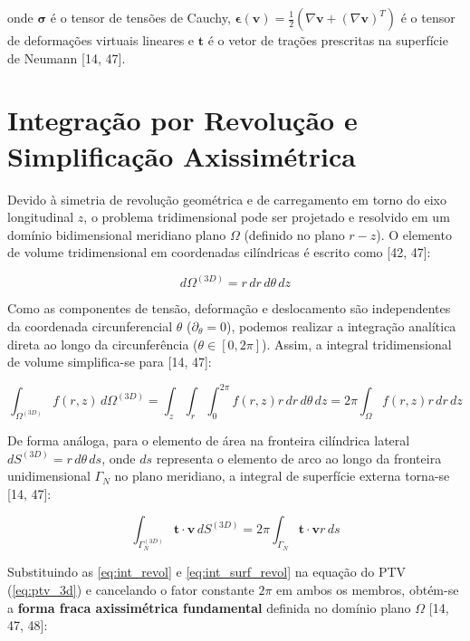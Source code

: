 onde $\mathbf{\sigma}$ é o tensor de tensões de Cauchy, $\mathbf{\epsilon}(\mathbf{v}) = \frac{1}{2} (\nabla \mathbf{v} + (\nabla \mathbf{v})^T)$ é o tensor de deformações virtuais lineares e $\mathbf{t}$ é o vetor de trações prescritas na superfície de Neumann [14, 47].

\section{Integração por Revolução e Simplificação Axissimétrica}

Devido à simetria de revolução geométrica e de carregamento em torno do eixo longitudinal $z$, o problema tridimensional pode ser projetado e resolvido em um domínio bidimensional meridiano plano $\Omega$ (definido no plano $r-z$). O elemento de volume tridimensional em coordenadas cilíndricas é escrito como [42, 47]:

\begin{equation}
  d \Omega^{(3D)} = r \, d r \, d \theta \, d z
  \label{eq:vol_element}
\end{equation}

Como as componentes de tensão, deformação e deslocamento são independentes da coordenada circunferencial $\theta$ ($\partial_{\theta} = 0$), podemos realizar a integração analítica direta ao longo da circunferência ($\theta \in [0, 2\pi]$). Assim, a integral tridimensional de volume simplifica-se para [14, 47]:

\begin{equation}
  \int_{\Omega^{(3D)}} f(r, z) \, d \Omega^{(3D)} = \int_{z} \int_{r} \int_0^{2\pi} f(r, z) r \, d r \, d \theta \, d z = 2 \pi \int_{\Omega} f(r, z) r \, d r \, d z
  \label{eq:int_revol}
\end{equation}

De forma análoga, para o elemento de área na fronteira cilíndrica lateral $d S^{(3D)} = r \, d \theta \, d s$, onde $d s$ representa o elemento de arco ao longo da fronteira unidimensional $\Gamma_N$ no plano meridiano, a integral de superfície externa torna-se [14, 47]:

\begin{equation}
  \int_{\Gamma_N^{(3D)}} \mathbf{t} \cdot \mathbf{v} \, d S^{(3D)} = 2 \pi \int_{\Gamma_N} \mathbf{t} \cdot \mathbf{v} r \, d s
  \label{eq:int_surf_revol}
\end{equation}

Substituindo as \eqref{eq:int_revol} e \eqref{eq:int_surf_revol} na equação do PTV (\eqref{eq:ptv_3d}) e cancelando o fator constante $2 \pi$ em ambos os membros, obtém-se a \textbf{forma fraca axissimétrica fundamental} definida no domínio plano $\Omega$ [14, 47, 48]:

